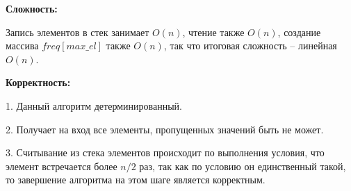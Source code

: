\documentclass[12pt]{extreport}
\begin{document}
	\bigskip
	
	{\bf Сложность:}
	
	Запись элементов в стек занимает $O(n)$, чтение также $O(n)$, создание массива $ freq[max\_el]$ также $O(n)$, так что итоговая сложность -- линейная $O(n)$.
	
	\bigskip
	
	{\bf Корректность:}
	
	1. Данный алгоритм детерминированный. 
	
	2. Получает на вход все элементы, пропущенных значений быть не может.
	
	3. Считывание из стека элементов происходит по выполнения условия, что элемент встречается более $n/2$ раз, так как по условию он единственный такой, то завершение алгоритма на этом шаге является корректным.
	
	
	
\end{document}
